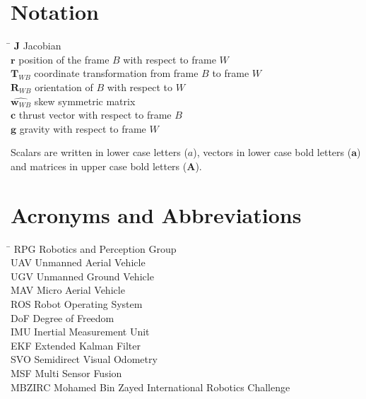 \section*{Notation}
  \begin{tabbing}
    \hspace*{1.6cm}   \= \kill
    $\mathbf{J}$       \> Jacobian \\[0.5ex]
    $\boldsymbol{r}$  \> position of the frame $B$ with respect to frame $W$ \\[0.5ex]
    $\mathbf{T}_{WB}$  \> coordinate transformation from frame $B$ to frame $W$ \\[0.5ex]
    $\mathbf{R}_{WB}$  \> orientation of $B$ with respect to $W$ \\[0.5ex]
    $\hat{\boldsymbol{w}_{WB}}$ \> skew symmetric matrix \\[0.5ex]
    $\boldsymbol{c}$  \> thrust vector with respect to frame $B$ \\[0.5ex]
    $\boldsymbol{g}$  \> gravity with respect to frame $W$ \\[0.5ex]
  \end{tabbing}
  
Scalars are written in lower case letters ($a$), vectors in lower case bold letters ($\mathbf{a}$) and matrices in upper case bold letters ($\mathbf{A}$).

\section*{Acronyms and Abbreviations}
  \begin{tabbing}
    \hspace*{1.6cm}  \= \kill
    RPG     \> Robotics and Perception Group \\[0.5ex]
    UAV     \> Unmanned Aerial Vehicle \\[0.5ex]
    UGV     \> Unmanned Ground Vehicle \\[0.5ex]
    MAV     \> Micro Aerial Vehicle \\[0.5ex]
    ROS     \> Robot Operating System \\[0.5ex]
    DoF     \> Degree of Freedom \\[0.5ex]
    IMU     \> Inertial Measurement Unit \\[0.5ex]
    EKF   \> Extended Kalman Filter \\[0.5ex]
    SVO   \> Semidirect Visual Odometry \\[0.5ex]
    MSF   \> Multi Sensor Fusion \\[0.5ex]
    MBZIRC    \> Mohamed Bin Zayed International Robotics Challenge \\[0.5ex]
  \end{tabbing}

\clearpage

